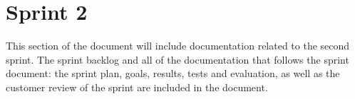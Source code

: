 \documentclass[../document.tex]{subfiles}
\begin{document}
\section*{Sprint 2}

This section of the document will include documentation related to the second sprint. The sprint backlog and all of the documentation that follows the sprint document: the sprint plan, goals, results, tests and evaluation, as well as the customer review of the sprint are included in the document.
\end{document}
